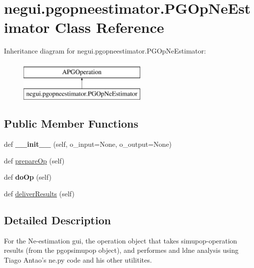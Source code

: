 \hypertarget{classnegui_1_1pgopneestimator_1_1PGOpNeEstimator}{}\section{negui.\+pgopneestimator.\+P\+G\+Op\+Ne\+Estimator Class Reference}
\label{classnegui_1_1pgopneestimator_1_1PGOpNeEstimator}
Inheritance diagram for negui.\+pgopneestimator.\+P\+G\+Op\+Ne\+Estimator\+:\begin{figure}[H]
\begin{center}
\leavevmode
\includegraphics[height=2.000000cm]{classnegui_1_1pgopneestimator_1_1PGOpNeEstimator}
\end{center}
\end{figure}
\subsection*{Public Member Functions}
\begin{DoxyCompactItemize}
\item 
def {\bfseries \+\_\+\+\_\+init\+\_\+\+\_\+} (self, o\+\_\+input=None, o\+\_\+output=None)\hypertarget{classnegui_1_1pgopneestimator_1_1PGOpNeEstimator_a64c3a02daa164ffaeb9466fb1a7ee300}{}\label{classnegui_1_1pgopneestimator_1_1PGOpNeEstimator_a64c3a02daa164ffaeb9466fb1a7ee300}

\item 
def \hyperlink{classnegui_1_1pgopneestimator_1_1PGOpNeEstimator_a37628c8a837a75a542ae82947dc367fd}{prepare\+Op} (self)
\item 
def {\bfseries do\+Op} (self)\hypertarget{classnegui_1_1pgopneestimator_1_1PGOpNeEstimator_a08032c5f1aec98e9da5b258287e67bcc}{}\label{classnegui_1_1pgopneestimator_1_1PGOpNeEstimator_a08032c5f1aec98e9da5b258287e67bcc}

\item 
def \hyperlink{classnegui_1_1pgopneestimator_1_1PGOpNeEstimator_ad20919b3cfce1fae03d64ae2aa19981f}{deliver\+Results} (self)
\end{DoxyCompactItemize}


\subsection{Detailed Description}
\begin{DoxyVerb}For the Ne-estimation gui, the operation object
that takes simupop-operation results (from the pgopsimupop
object), and performes and ldne analysis using Tiago Antao's
ne.py code and his other utilitites.
\end{DoxyVerb}
 

